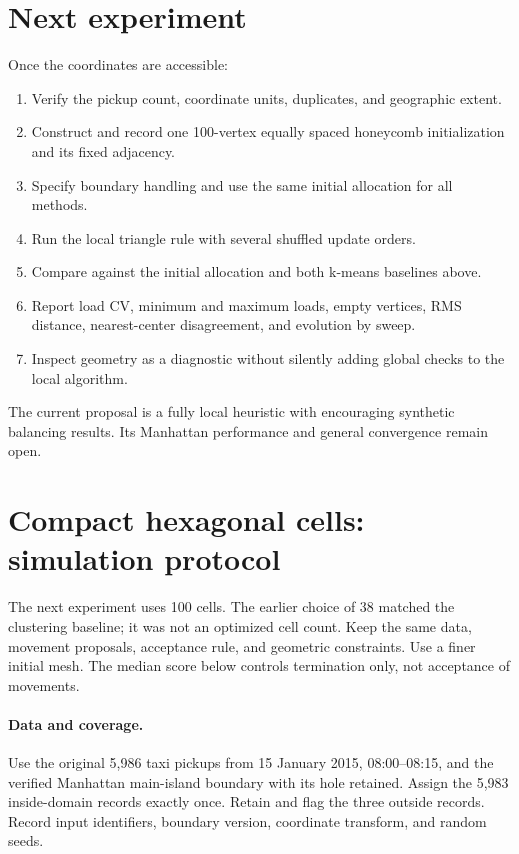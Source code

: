 \documentclass[11pt]{article}
\begin{document}
\section{Next experiment}
Once the coordinates are accessible:
\begin{enumerate}
\item Verify the pickup count, coordinate units, duplicates, and geographic extent.
\item Construct and record one 100-vertex equally spaced honeycomb initialization and its fixed adjacency.
\item Specify boundary handling and use the same initial allocation for all methods.
\item Run the local triangle rule with several shuffled update orders.
\item Compare against the initial allocation and both k-means baselines above.
\item Report load CV, minimum and maximum loads, empty vertices, RMS distance, nearest-center disagreement, and evolution by sweep.
\item Inspect geometry as a diagnostic without silently adding global checks to the local algorithm.
\end{enumerate}
The current proposal is a fully local heuristic with encouraging synthetic balancing results. Its Manhattan performance and general convergence remain open.

\section{Compact hexagonal cells: simulation protocol}
\label{sec:compact-hexagon-protocol}

The next experiment uses 100 cells. The earlier choice of 38 matched
the clustering baseline; it was not an optimized cell count.
Keep the same data, movement proposals, acceptance rule, and geometric
constraints. Use a finer initial mesh. The median score below controls
termination only, not acceptance of movements.

\paragraph{Data and coverage.}
Use the original 5,986 taxi pickups from 15 January 2015,
08:00--08:15, and the verified Manhattan main-island boundary with
its hole retained. Assign the 5,983 inside-domain records exactly once.
Retain and flag the three outside records. Record input identifiers,
boundary version, coordinate transform, and random seeds.
\end{document}
